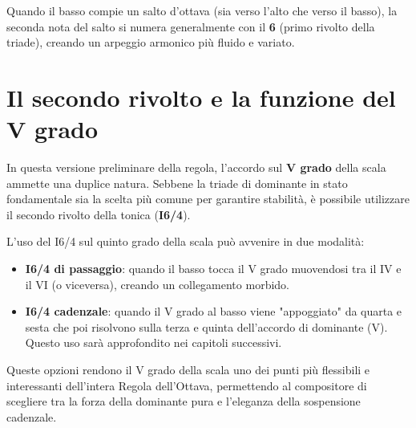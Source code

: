 \begin{regola}
	\label{reg:salto_ottava_basso}
	Quando il basso compie un salto d'ottava (sia verso l'alto che verso il basso), la seconda nota del salto si numera generalmente con il \textbf{6} (primo rivolto della triade), creando un arpeggio armonico più fluido e variato.
\end{regola}



\section{Il secondo rivolto e la funzione del V grado}
\label{sec:secondo_rivolto_regola}

In questa versione preliminare della regola, l'accordo sul \textbf{V grado} della scala ammette una duplice natura. Sebbene la triade di dominante in stato fondamentale sia la scelta più comune per garantire stabilità, è possibile utilizzare il secondo rivolto della tonica (\textbf{I6/4}).

L'uso del I6/4 sul quinto grado della scala può avvenire in due modalità:

\begin{itemize}
	\item \textbf{I6/4 di passaggio}: quando il basso tocca il V grado muovendosi tra il IV e il VI (o viceversa), creando un collegamento morbido.
	\item \textbf{I6/4 cadenzale}: quando il V grado al basso viene "appoggiato" da quarta e sesta che poi risolvono sulla terza e quinta dell'accordo di dominante (V). Questo uso sarà approfondito nei capitoli successivi.
\end{itemize}

Queste opzioni rendono il V grado della scala uno dei punti più flessibili e interessanti dell'intera Regola dell'Ottava, permettendo al compositore di scegliere tra la forza della dominante pura e l'eleganza della sospensione cadenzale.

